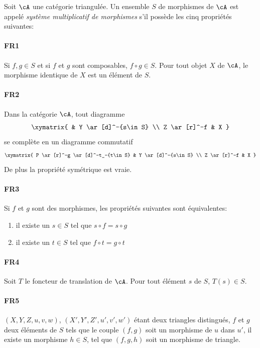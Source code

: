 \begin{definition}
Soit $\cA$ une catégorie triangulée. Un ensemble $S$ de morphismes de $\cA$ 
est appelé \emph{système multiplicatif de morphismes} s'il possède les 
cinq propriétés suivantes: 

\paragraph{FR1}
\hypertarget{VIII:FR1}{}
Si $f,g\in S$ et si $f$ et $g$ sont composables, $f\circ g\in S$. Pour tout 
objet $X$ de $\cA$, le morphisme identique de $X$ est un élément de $S$. 

\paragraph{FR2}
\hypertarget{VIII:FR2}{}
Dans la catégorie $\cA$, tout diagramme 
\[\xymatrix{
  & Y \ar[d]^-{s\in S} \\
  Z \ar[r]^-f 
    & X 
}\]
se complète en un diagramme commutatif 
\[\xymatrix{
  P \ar[r]^-g \ar[d]^-t_-{t\in S} 
    & Y \ar[d]^-{s\in S} \\
  Z \ar[r]^-f 
    & X 
}\]
De plus la propriété symétrique est vraie. 

\paragraph{FR3}
\hypertarget{VIII:FR3}{}
Si $f$ et $g$ sont des morphismes, les propriétés suivantes sont 
équivalentes: 
\begin{enumerate}[\indent i)]
  \item il existe un $s\in S$ tel que $s\circ f=s\circ g$ 
  \item il existe un $t\in S$ tel que $f\circ t=g\circ t$
\end{enumerate}

\paragraph{FR4}
\hypertarget{VIII:FR4}{}
Soit $T$ le foncteur de translation de $\cA$. Pour tout élément $s$ de $S$, 
$T(s)\in S$. 

\paragraph{FR5}
\hypertarget{VIII:FR5}{}
$(X,Y,Z,u,v,w)$, $(X',Y',Z',u',v',w')$ étant deux triangles distingués, 
$f$ et $g$ deux éléments de $S$ tels que le couple $(f,g)$ soit un 
morphisme de $u$ dans $u'$, il existe un morphisme $h\in S$, tel que 
$(f,g,h)$ soit un morphisme de triangle. 
\end{definition}


